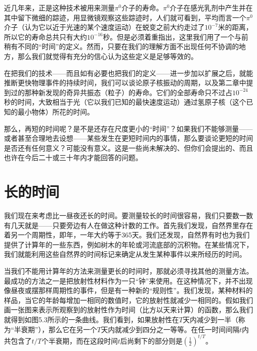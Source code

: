 近几年来，正是这种技术被用来测量$\pi^0$介子的寿命。$\pi^0$介子在感光乳剂中产生并在其中留下微细的踪迹，用显微镜观察这些踪迹时，人们就可看到，平均而言一个$\pi^0$介子（认为它以近于光速的某个速度运动）在蜕变之前大约走过了$ 10^{-7} $米的距离，所以它的寿命总共只有大约$ 10^{-16} $秒。但是必须着重指出，这里我们用了一个与前稍有不同的“时间”的定义。然而，只要在我们的理解方面不出现任何不协调的地方，那么我们就觉得有充分的信心认为这些定义是足够等效的。

在把我们的技术——而且如有必要也把我们的定义——进一步加以扩展之后，就能推断更快物理事件的持续时间，我们可以谈论原子核振动的周期，以及第二章中提到过的那种新发现的奇异共振态（粒子）的寿命。它们的全部寿命只不过占$ 10^{-24} $秒的时间，大致相当于光（它以我们已知的最快速度运动）通过氢原子核（这个已知的最小物体）所花的时间。

那么，再短的时间呢？是不是还存在尺度更小的“时间”？如果我们不能够测量——或者甚至合理地去设想——某些发生在更短时间内的事情，那么要谈论更短的时间是否还有任何意义？可能没有意义。这是一些尚未解决的、但你们会提出的、而且也许在今后二十或三十年内才能回答的问题。


\section{长的时间}

我们现在来考虑比一昼夜还长的时间。要测量较长的时间很容易，我们只要数一数有几天就是——只要旁边有人在做这种计数的工作。首先我们发现，自然界里存在着另一个周期性，即年，一年大约等于365天。我们还发现，自然界有时也为我们提供了计算年的一些东西，例如树木的年轮或河流底部的沉积物。在某些情况下，我们就能利用这些自然界的时间标记来确定从发生某种事件以来所经历的时间。

当我们不能用计算年的方法来测量更长的时间时，那就必须寻找其他的测量方法。最成功的方法之一是把放射性材料作为一只“钟”来使用。在这种情况下，并不出现像昼夜或摆那样周期性的事件，但是有一种新的“规则性”。我们发现，某种材料的样品，当它的年龄每增加一相同的数值时，它的放射性就减少一相同的。假如我们画一张图来表示所观察到的放射性作为时间（比方以天来计算）的函数，那么我们就得到如图5.3所示的一条曲线。我们看到，如果放射性在$ T $天内减少到一半（称为“半衰期”），那么它在另一个$ T $天内就减少到四分之一等等。在任一时间间隔$ t $内共包含了$ t/T $个半衰期，而在这段时间$ t $后尚剩下的部分则是$ (\tfrac{1}{2})^{t/T} $。

